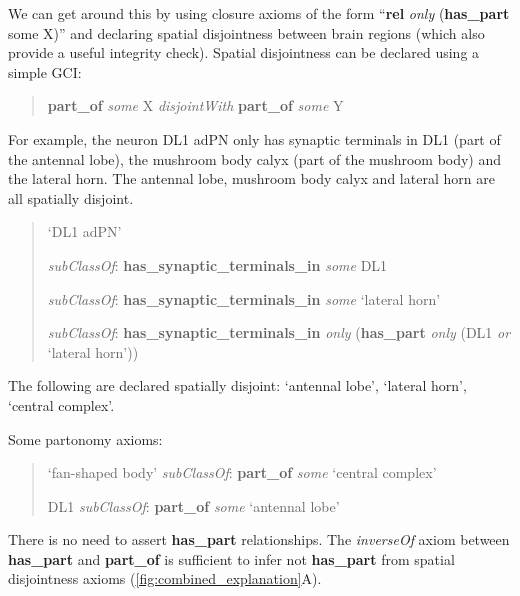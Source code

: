 \documentclass[runningheads,a4paper]{llncs}
\begin{document}
We can get around this by using closure axioms of the form
``\textbf{rel} \textit{only} (\textbf{has\_part} some X)'' and declaring spatial
disjointness between brain regions (which also provide a useful
integrity check). Spatial disjointness can be declared using a simple
GCI:

\begin{quote} 
\textbf{part\_of} \textit{some} X \textit{disjointWith} \textbf{part\_of} \textit{some} Y
\end{quote}

For example, the neuron DL1 adPN only has synaptic terminals in DL1
(part of the antennal lobe), the mushroom body calyx (part of the
mushroom body) and the lateral horn.  The antennal lobe, mushroom body
calyx  and lateral horn are all spatially disjoint.


\begin{quote} 
`DL1 adPN'

\textit{subClassOf}: \textbf{has\_synaptic\_terminals\_in}
\textit{some} DL1

\textit{subClassOf}: \textbf{has\_synaptic\_terminals\_in}
\textit{some} `lateral horn'

\textit{subClassOf}: \textbf{has\_synaptic\_terminals\_in} \textit{only} (\textbf{has\_part} \textit{only} (DL1 \textit{or} `lateral horn'))
\end{quote}

The following are declared spatially disjoint:  `antennal lobe',
`lateral horn', `central complex'.

Some partonomy axioms:
\begin{quote} 
`fan-shaped body' \textit{subClassOf}: \textbf{part\_of} \textit{some}
`central complex'

DL1 \textit{subClassOf}: \textbf{part\_of} \textit{some} `antennal lobe'
\end{quote}
There is no need to assert \textbf{has\_part} relationships. The
\textit{inverseOf} axiom between \textbf{has\_part} and
\textbf{part\_of} is sufficient to infer not \textbf{has\_part} from
spatial disjointness axioms (\ref{fig:combined_explanation}A).

\end{document}

